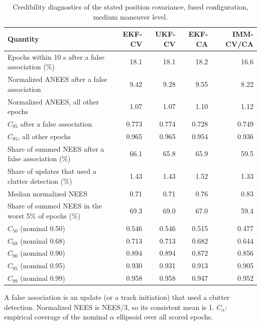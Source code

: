 \begin{table}[!htbp]
\caption{Credibility diagnostics of the stated position covariance, fused configuration, medium maneuver level.}
\label{tab:S6}
\centering\footnotesize\setlength{\tabcolsep}{5pt}
\begin{tabular}{@{}lrrrr@{}}
\toprule
Quantity & EKF-CV & UKF-CV & EKF-CA & IMM-CV/CA \\
\midrule
Epochs within 10 s after a false association (\%) & 18.1 & 18.1 & 18.2 & 16.6 \\
Normalized ANEES after a false association & 9.42 & 9.28 & 9.55 & 8.22 \\
Normalized ANEES, all other epochs & 1.07 & 1.07 & 1.10 & 1.12 \\
$C_{95}$ after a false association & 0.773 & 0.774 & 0.728 & 0.749 \\
$C_{95}$, all other epochs & 0.965 & 0.965 & 0.954 & 0.936 \\
Share of summed NEES after a false association (\%) & 66.1 & 65.8 & 65.9 & 59.5 \\
Share of updates that used a clutter detection (\%) & 1.43 & 1.43 & 1.52 & 1.33 \\
Median normalized NEES & 0.71 & 0.71 & 0.76 & 0.83 \\
Share of summed NEES in the worst 5\% of epochs (\%) & 69.3 & 69.0 & 67.0 & 59.4 \\
$C_{50}$ (nominal 0.50) & 0.546 & 0.546 & 0.515 & 0.477 \\
$C_{68}$ (nominal 0.68) & 0.713 & 0.713 & 0.682 & 0.644 \\
$C_{90}$ (nominal 0.90) & 0.894 & 0.894 & 0.872 & 0.856 \\
$C_{95}$ (nominal 0.95) & 0.930 & 0.931 & 0.913 & 0.905 \\
$C_{99}$ (nominal 0.99) & 0.958 & 0.958 & 0.947 & 0.952 \\
\bottomrule
\end{tabular}

\smallskip
\parbox{\textwidth}{\footnotesize A false association is an update (or a track initiation) that used a clutter detection. Normalized NEES is NEES/3, so its consistent mean is 1. $C_\alpha$: empirical coverage of the nominal $\alpha$ ellipsoid over all scored epochs.}
\end{table}
